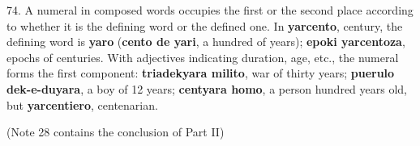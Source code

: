74. A numeral in composed words occupies the first or the second place according to whether it is the defining word or the defined one. In \textbf{yarcento}, century, the defining word is \textbf{yaro} (\textbf{cento de yari}, a hundred of years); \textbf{epoki yarcentoza}, epochs of centuries. With adjectives indicating duration, age, etc., the numeral forms the first component: \textbf{triadekyara milito}, war of thirty years; \textbf{puerulo dek-e-duyara}, a boy of 12 years; \textbf{centyara homo}, a person hundred years old, but \textbf{yarcentiero}, centenarian. 

(Note 28 contains the conclusion of Part II) 